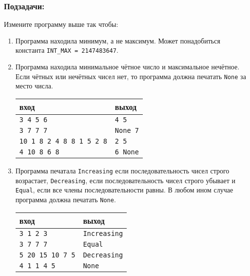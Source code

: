 \documentclass{article}
\begin{document}
\subsubsection*{Подзадачи:}
Измените программу выше так чтобы:
\begin{enumerate}
\item Программа находила минимум, а не максимум. Может понадобиться константа \texttt{INT\_MAX = 2147483647}.
\item Программа находила минимальное чётное число и максимальное нечётное. Если чётных или нечётных чисел нет, то программа должна печатать \texttt{None} за место числа.
\begin{center}
\begin{tabular}{ l l }
 вход & выход \\ \hline
 \texttt{3 4 5 6} & \texttt{4 5}  \\ 
 \texttt{3 7 7 7} & \texttt{None 7}  \\
 \texttt{10 1 8 2 4 8 8 1 5 2 8} & \texttt{2 5} \\
 \texttt{4 10 8 6 8} & \texttt{6 None}
\end{tabular}
\end{center}

\item Программа печатала \texttt{Increasing} если последовательность чисел строго возрастает, \texttt{Decreasing}, если последовательность чисел строго убывает и \texttt{Equal}, если все члены последовательности равны. В любом ином случае программа должна печатать \texttt{None}.
\begin{center}
\begin{tabular}{ l l }
 вход & выход \\ \hline
 \texttt{3 1 2 3} & \texttt{Increasing}  \\ 
 \texttt{3 7 7 7} & \texttt{Equal}  \\
 \texttt{5 20 15 10 7 5} & \texttt{Decreasing}  \\ 
 \texttt{4 1 1 4 5} & \texttt{None}
\end{tabular}
\end{center}
\end{enumerate}
\end{document}
